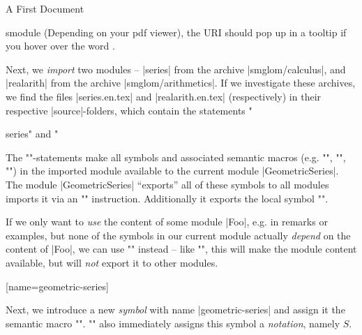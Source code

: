 \begin{sfragment}{A First \sTeX Document}
\begin{environment}{smodule}
      (Depending on your pdf viewer), the URI should pop up in a tooltip if you hover over
      the word .
    \end{environment}\bigskip

    \begin{latexcode}[numbers=none,aboveskip=0pt,belowskip=0pt,gobble=8]
    \end{latexcode}
    \begin{function}{\importmodule}
      Next, we \emph{import} two modules -- |series| from the \sTeX archive
      |smglom/calculus|, and |realarith| from the \sTeX archive |smglom/arithmetics|. If
      we investigate these archives, we find the files |series.en.tex| and
      |realarith.en.tex| (respectively) in their respective |source|-folders, which
      contain the statements \stexcode"\begin{smodule}{series}" and
        \stexcode"\end{smodule}\fi

      The \stexcode"\importmodule"-statements make all \stex symbols and associated
      semantic macros (e.g. \stexcode"\infinitesum", \stexcode"\realdivide",
      \stexcode"\realpower") in the imported module available to the current module
      |GeometricSeries|. The module |GeometricSeries| ``exports'' all of these symbols to
      all modules imports it via an \stexcode""
      instruction. Additionally it exports the local symbol \stexcode"\geometricSeries".
    \end{function}

    \begin{function}{\usemodule}
      If we only want to \emph{use} the content of some module |Foo|,
      e.g. in remarks or examples, but none
      of the symbols in our current module actually \emph{depend} on
      the content of |Foo|, we can use \stexcode"\usemodule" instead -- like
      \stexcode"\importmodule", this will make the module content available,
      but will \emph{not} export it to other modules.
    \end{function}\bigskip

    \begin{latexcode}[numbers=none,aboveskip=0pt,belowskip=0pt,gobble=6]
      [name=geometric-series]{}
        \end{latexcode}
    \begin{function}{\symdef}
      Next, we introduce a new \emph{symbol} with name
      |geometric-series| and assign it the semantic macro
      \stexcode"\geometricSeries".
      \stexcode"\symdef" also immediately assigns this symbol a \emph{notation},
      namely $S$.
    \end{function}


\end{sfragment}
